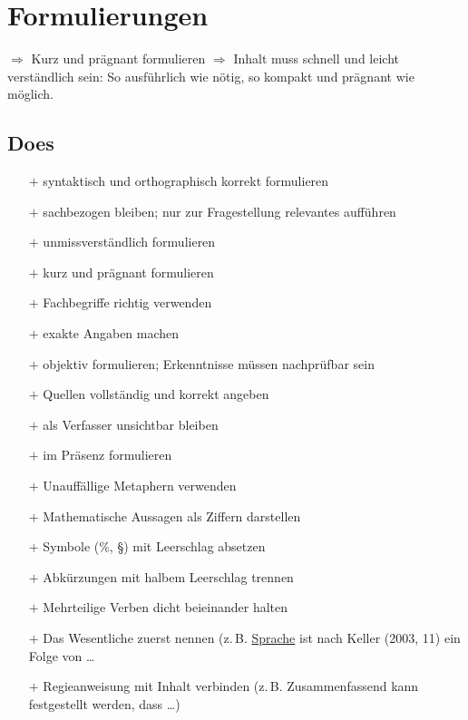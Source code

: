 \section{Formulierungen}
$\Rightarrow$ Kurz und prägnant formulieren $\Rightarrow$ Inhalt muss schnell und leicht verständlich sein: So ausführlich wie nötig, so kompakt und prägnant wie möglich.

\subsection{Does}
\begin{itemize}\itemsep0em
	\item[$+$] syntaktisch und orthographisch korrekt formulieren
	\item[$+$] sachbezogen bleiben; nur zur Fragestellung relevantes aufführen
	\item[$+$] unmissverständlich formulieren
	\item[$+$] kurz und prägnant formulieren
	\item[$+$] Fachbegriffe richtig verwenden
	\item[$+$] exakte Angaben machen
	\item[$+$] objektiv formulieren; Erkenntnisse müssen nachprüfbar sein
	\item[$+$] Quellen vollständig und korrekt angeben
	\item[$+$] als Verfasser unsichtbar bleiben
	\item[$+$] im Präsenz formulieren
	\item[$+$] Unauffällige Metaphern verwenden 
	\item[$+$] Mathematische Aussagen als Ziffern darstellen
	\item[$+$] Symbole (\%, \S) mit Leerschlag absetzen
	\item[$+$] Abkürzungen mit halbem Leerschlag trennen
	\item[$+$] Mehrteilige Verben dicht beieinander halten
	\item[$+$] Das Wesentliche zuerst nennen (z.\,B. \underline{Sprache} ist nach Keller (2003, 11) ein Folge von \dots
	\item[$+$] Regieanweisung mit Inhalt verbinden (z.\,B. Zusammenfassend kann festgestellt werden, dass \dots)
\end{itemize}

